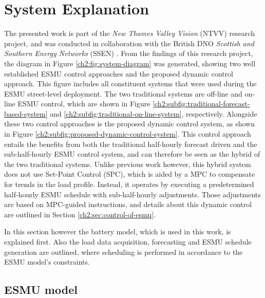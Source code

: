 \section{System Explanation}
\label{ch2:sec:system-explanation}



The presented work is part of the \textit{New Thames Valley Vision} (NTVV) research project, and was conducted in collaboration with the British DNO \textit{Scottish and Southern Energy Networks} (SSEN) \cite{NTVV2016}.
From the findings of this research project, the diagram in Figure \ref{ch2:fig:system-diagram} was generated, showing two well established ESMU control approaches and the proposed dynamic control approach.
This figure includes all constituent systems that were used during the ESMU street-level deployment.
The two traditional systems are off-line and on-line ESMU control, which are shown in Figure \ref{ch2:subfig:traditional-forecast-based-system} and \ref{ch2:subfig:traditional-on-line-system}, respectively.
Alongside these two control approaches is the proposed dynamic control system, as shown in Figure \ref{ch2:subfig:proposed-dynamic-control-system}.
This control approach entails the benefits from both the traditional half-hourly forecast driven and the sub-half-hourly ESMU control system, and can therefore be seen as the hybrid of the two traditional systems.
Unlike previous work however, this hybrid system does not use Set-Point Control (SPC), which is aided by a MPC to compensate for trends in the load profile.
Instead, it operates by executing a predetermined half-hourly ESMU schedule with sub-half-hourly adjustments.
Those adjustments are based on MPC-guided instructions, and details about this dynamic control are outlined in Section \ref{ch2:sec:control-of-esmu}.

In this section however the battery model, which is used in this work, is explained first.
Also the load data acquisition, forecasting and ESMU schedule generation are outlined, where scheduling is performed in accordance to the ESMU model's constraints.

\subsection{ESMU model}

